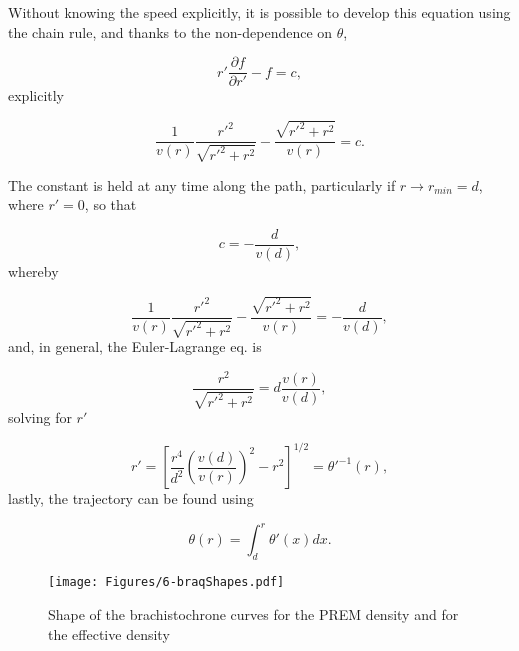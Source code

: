 \documentclass[aps,twocolumn,showpacs,preprintnumbers]{revtex4}
\begin{document}
    Without knowing the speed explicitly, it is possible to develop this equation using the chain rule, and thanks to the non-dependence on $ \theta $,
    
    \begin{equation*}
        r' \frac{\partial f}{\partial r'} - f = c ,
    \end{equation*}
    explicitly
    
    \begin{equation*}
        \frac{1}{v(r)} \frac{{r'}^2}{\sqrt{{r'}^2 + r^2}} - \frac{\sqrt{{r'}^2 + r^2}}{v(r)} = c.
    \end{equation*}
    
    The constant is held at any time along the path, particularly if $ r \rightarrow r_ {min} = d $, where $ r '= 0 $, so that
    
    \begin{equation*}
        c = -\frac{d}{v(d)},
    \end{equation*}
    whereby
    
    \begin{equation*}
         \frac{1}{v(r)} \frac{{r'}^2}{\sqrt{{r'}^2 + r^2}} - \frac{\sqrt{{r'}^2 + r^2}}{v(r)} =   -\frac{d}{v(d)},
    \end{equation*}
    and, in general, the  Euler-Lagrange eq. is
    
    \begin{equation*}
        \frac{r^2}{\sqrt{{r'}^2 + r^2}} = d \frac{v(r)}{v(d)},
    \end{equation*}
    solving for $r'$
    
    
    
    \begin{equation}
        r' = \left[ \frac{r^4 }{d^2} \left( \frac{v(d)}{v(r)} \right)^2 - r^2  \right]^{1/2} =  \theta'^{-1}(r),
        \label{1 - theta p inverse as function of r,d} 
    \end{equation}
    lastly, the trajectory can be found using
    
    \begin{equation}
        \theta(r) = \int_{d}^{r} \theta' (x) dx.
        \label{1 - trajectory integral}
    \end{equation}


    \begin{figure}
    \centering
    \texttt{[image: Figures/6-braqShapes.pdf]}
    \caption{Shape of the brachistochrone curves for the PREM density and for the effective density }
        \label{fig:1-braquistochrone}
    \end{figure}
\end{document}

